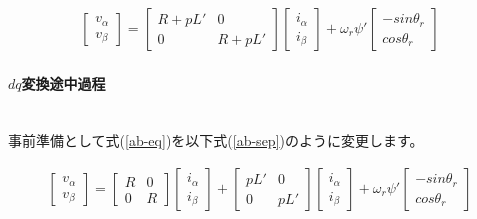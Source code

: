 {\large
\begin{align*}
    \begin{bmatrix}
        v_{\alpha} \\
        v_{\beta}
    \end{bmatrix}
    =
    \begin{bmatrix}
        R+pL' & 0 \\
        0 & R+pL'
    \end{bmatrix}
    \begin{bmatrix}
        i_{\alpha} \\
        i_{\beta}
    \end{bmatrix}
    + \omega_{r}\psi'
    \begin{bmatrix}
        -sin\theta_{r} \\
        cos\theta_{r}
    \end{bmatrix}
\end{align*}
}

\newpage
\paragraph{$dq$変換途中過程}\mbox{}\\
事前準備として式(\ref{ab-eq})を以下式(\ref{ab-sep})のように変更します。
\begin{fleqn}[8pt]
{\large
\begin{align}
    \begin{bmatrix}
        v_{\alpha} \\
        v_{\beta}
    \end{bmatrix}
    =
    \begin{bmatrix}
        R & 0 \\
        0 & R
    \end{bmatrix}
    \begin{bmatrix}
        i_{\alpha} \\
        i_{\beta}
    \end{bmatrix}
    +
    \begin{bmatrix}
        pL' & 0 \\
        0 & pL'
    \end{bmatrix}
    \begin{bmatrix}
        i_{\alpha} \\
        i_{\beta}
    \end{bmatrix}
    + \omega_{r}\psi'
    \begin{bmatrix}
        -sin\theta_{r} \\
        cos\theta_{r}
    \end{bmatrix}
    \label{ab-sep}
\end{align}
}
\end{fleqn}

